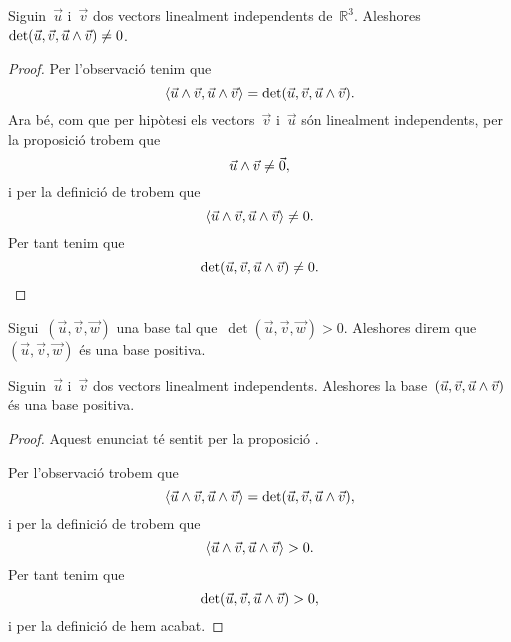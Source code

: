 \documentclass[../../main.tex]{subfiles}
\begin{document}
    \begin{proposition}
        \label{prop:el determinant de dos vectors linealment independents i el seu producte vectorial és diferent de zero}
        Siguin~\(\vec{u}\) i~\(\vec{v}\) dos vectors linealment independents de~\(\mathbb{R}^{3}\).
        Aleshores~\(\det(\vec{u},\vec{v},\vec{u}\mathbin{\wedge}\vec{v})\neq0\).
        \begin{proof}
            Per l'observació  tenim que
            \[
                \prodesc{\vec{u}\prodvec\vec{v}}{\vec{u}\prodvec\vec{v}}=\det(\vec{u},\vec{v},\vec{u}\prodvec\vec{v}).
            \]
            Ara bé, com que per hipòtesi els vectors~\(\vec{v}\) i~\(\vec{u}\) són linealment independents, per la proposició  trobem que
            \[
                \vec{u}\mathbin{\wedge}\vec{v}\neq\vec{0},
            \]
            i per la definició de  trobem que
            \[
                \prodesc{\vec{u}\prodvec\vec{v}}{\vec{u}\prodvec\vec{v}}\neq0.
            \]
            Per tant tenim que
            \[
                \det(\vec{u},\vec{v},\vec{u}\mathbin{\wedge}\vec{v})\neq0.\qedhere
            \]
        \end{proof}
    \end{proposition}
    \begin{definition}
        \label{orientació d'una base}
        \label{def:base positiva}
        Sigui~\((\vec{u},\vec{v},\vec{w})\) una base tal que~\(\det(\vec{u},\vec{v},\vec{w})>0\).
        Aleshores direm que~\((\vec{u},\vec{v},\vec{w})\) és una base positiva.
    \end{definition}
    \begin{proposition}
        \label{prop:dos vectors linealment independents i el seu producte vectorial formen una base positiva}
        Siguin~\(\vec{u}\) i~\(\vec{v}\) dos vectors linealment independents.
        Aleshores la base~\((\vec{u},\vec{v},\vec{u}\mathbin{\wedge}\vec{v})\) és una base positiva.
        \begin{proof}
            Aquest enunciat té sentit per la proposició .

            Per l'observació  trobem que
            \[
                \prodesc{\vec{u}\prodvec\vec{v}}{\vec{u}\prodvec\vec{v}}=\det(\vec{u},\vec{v},\vec{u}\prodvec\vec{v}),
            \]
            i per la definició de  trobem que
            \[
                \prodesc{\vec{u}\prodvec\vec{v}}{\vec{u}\prodvec\vec{v}}>0.
            \]
            Per tant tenim que
            \[
                \det(\vec{u},\vec{v},\vec{u}\mathbin{\wedge}\vec{v})>0,
            \]
            i per la definició de  hem acabat.
        \end{proof}
    \end{proposition}
\end{document}
